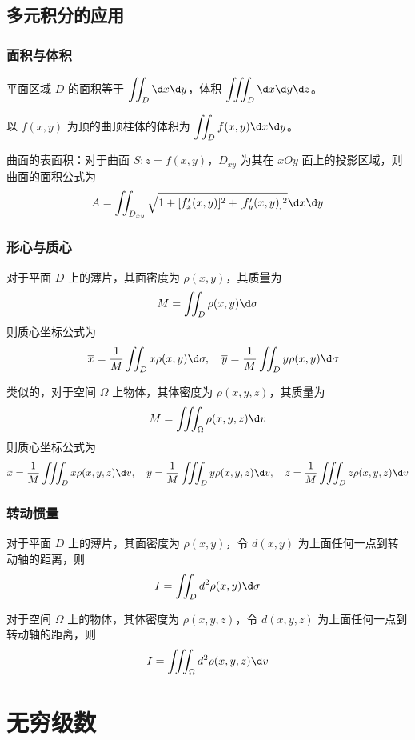 \subsection{多元积分的应用}

\subsubsection*{面积与体积}

平面区域 $D$ 的面积等于 $\displaystyle \iint_D \d x \d y$，体积 $\displaystyle \iiint_D \d x \d y \d z$。

以 $f(x,y)$ 为顶的曲顶柱体的体积为 $\displaystyle \iint_D f(x, y)\d x \d y$。

曲面的表面积：对于曲面 $S: z = f(x,y)$，$D_{xy}$ 为其在 $xOy$ 面上的投影区域，则曲面的面积公式为
\[ A = \iint_{D_{xy}} \sqrt{ 1 + [f_x'(x,y)]^2 + [f_y'(x,y)]^2 } \d x \d y \]


\subsubsection*{形心与质心}

对于平面 $D$ 上的薄片，其面密度为 $\rho(x, y)$，其质量为
\[ M = \iint_D \rho(x,y) \d \sigma \]
则质心坐标公式为
\[ \quad \overline{x} = \frac{1}{M}\iint_D x \rho(x,y) \d \sigma, \quad \overline{y} =\frac{1}{M}\iint_D y \rho(x,y) \d \sigma \]

类似的，对于空间 $\Omega$ 上物体，其体密度为 $\rho(x, y, z)$，其质量为
\[ M = \iiint_\Omega \rho(x,y,z) \d v \]
则质心坐标公式为
\[ \overline{x} = \frac{1}{M}\iiint_D x \rho(x,y,z) \d v, \quad \overline{y} = \frac{1}{M}\iiint_D y \rho(x,y,z) \d v, \quad \overline{z} = \frac{1}{M}\iiint_D z \rho(x,y,z) \d v \]

\subsubsection*{转动惯量}

对于平面 $D$ 上的薄片，其面密度为 $\rho(x, y)$，令 $d(x,y)$ 为上面任何一点到转动轴的距离，则
\[ I = \iint_D d^2 \rho(x, y) \d \sigma \]

对于空间 $\Omega$ 上的物体，其体密度为 $\rho(x, y, z)$，令 $d(x,y,z)$ 为上面任何一点到转动轴的距离，则
\[ I = \iiint_\Omega d^2 \rho(x, y, z) \d v \]

\section{无穷级数}

